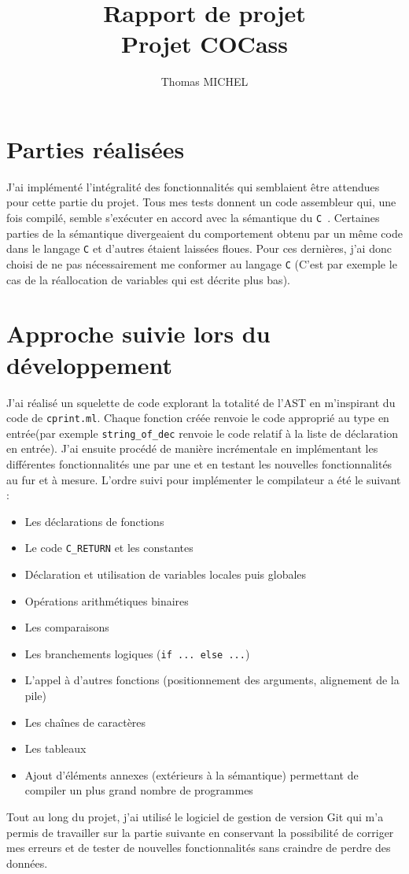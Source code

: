 \documentclass[11pt]{article}
\title{Rapport de projet \\ Projet COCass}
\author{Thomas MICHEL}
\newcommand{\Cmm}{\texttt{C\textminus\textminus\ }}
\newcommand{\ttt}[1]{\texttt{#1}}
\begin{document}
\maketitle
\section{Parties réalisées}
J'ai implémenté l'intégralité des fonctionnalités qui semblaient être attendues pour cette partie du projet.
Tous mes tests donnent un code assembleur qui, une fois compilé, semble s'exécuter en accord avec la sémantique du \Cmm.
Certaines parties de la sémantique divergeaient du comportement obtenu par un même code dans le langage \ttt{C} et d'autres étaient laissées floues.
Pour ces dernières, j'ai donc choisi de ne pas nécessairement me conformer au langage \ttt{C} (C'est par exemple le cas de la réallocation de variables qui est décrite plus bas).

\section{Approche suivie lors du développement}
J'ai réalisé un squelette de code explorant la totalité de l'AST en m'inspirant du code de \texttt{cprint.ml}.
Chaque fonction créée renvoie le code approprié au type en entrée(par exemple \texttt{string\_of\_dec} renvoie le code relatif à la liste de déclaration en entrée).
J'ai ensuite procédé de manière incrémentale en implémentant les différentes fonctionnalités une par une et en testant les nouvelles fonctionnalités au fur et à mesure.
L'ordre suivi pour implémenter le compilateur a été le suivant :
\begin{itemize}
    \item Les déclarations de fonctions
    \item Le code \texttt{C\_RETURN} et les constantes
    \item Déclaration et utilisation de variables locales puis globales
    \item Opérations arithmétiques binaires
    \item Les comparaisons
    \item Les branchements logiques (\texttt{if ... else ...})
    \item L'appel à d'autres fonctions (positionnement des arguments, alignement de la pile)
    \item Les chaînes de caractères
    \item Les tableaux
    \item Ajout d'éléments annexes (extérieurs à la sémantique) permettant de compiler un plus grand nombre de programmes
\end{itemize}
Tout au long du projet, j'ai utilisé le logiciel de gestion de version Git qui m'a permis de travailler sur la partie suivante en conservant la possibilité de corriger mes erreurs et de tester de nouvelles fonctionnalités sans craindre de perdre des données.
\end{document}
